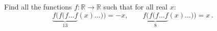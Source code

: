 \problem
Find all the functions $f \colon \mathbb{R} \to \mathbb{R}$ such that for all real $x$:
\[
    \underbrace{f(f(f \ldots f}_{13}(x)\ldots)) = -x
,\qquad
    \underbrace{f(f(f\ldots f}_{8}(x)\ldots)) = x
\,.\]
\solution
\endproblem
